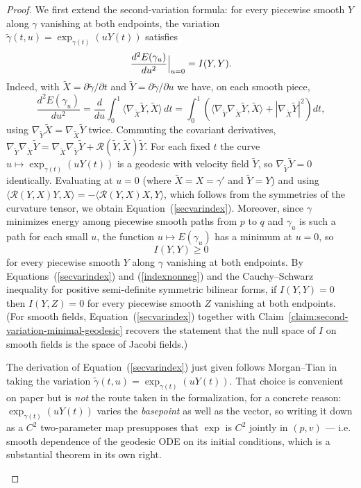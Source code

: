 \begin{proof}
We first extend the second-variation formula: for every piecewise
smooth $Y$ along $\gamma$ vanishing at both endpoints, the variation
$\tilde\gamma(t,u)=\exp_{\gamma(t)}(uY(t))$ satisfies
\begin{equation}\label{secvarindex}
\frac{d^2E(\gamma_u)}{du^2}\Bigl|_{u=0}\Bigr.=I(Y,Y).
\end{equation}
Indeed, with $\widetilde X=\partial\tilde\gamma/\partial t$ and
$\widetilde Y=\partial\tilde\gamma/\partial u$ we have, on each
smooth piece,
$$\frac{d^2E(\gamma_u)}{du^2}
=\frac{d}{du}\int_0^1\langle\nabla_{\widetilde X}\widetilde
Y,\widetilde X\rangle\,dt
=\int_0^1\left(\langle\nabla_{\widetilde Y}\nabla_{\widetilde
X}\widetilde Y,\widetilde X\rangle
+|\nabla_{\widetilde X}\widetilde Y|^2\right)dt,$$
using $\nabla_{\widetilde Y}\widetilde X=\nabla_{\widetilde
X}\widetilde Y$ twice. Commuting the covariant derivatives,
$\nabla_{\widetilde Y}\nabla_{\widetilde X}\widetilde
Y=\nabla_{\widetilde X}\nabla_{\widetilde Y}\widetilde Y+{\mathcal
R}(\widetilde Y,\widetilde X)\widetilde Y$. For each fixed $t$ the
curve $u\mapsto\exp_{\gamma(t)}(uY(t))$ is a geodesic with velocity
field $\widetilde Y$, so $\nabla_{\widetilde Y}\widetilde Y=0$
identically. Evaluating at $u=0$ (where $\widetilde X=X=\gamma'$ and
$\widetilde Y=Y$) and using
$\langle{\mathcal R}(Y,X)Y,X\rangle=-\langle{\mathcal
R}(Y,X)X,Y\rangle$, which follows from the symmetries of the
curvature tensor, we obtain
Equation~(\ref{secvarindex}). Moreover, since $\gamma$ minimizes
energy among piecewise smooth paths from $p$ to $q$ and
$\gamma_u$ is such a path for each small $u$, the function
$u\mapsto E(\gamma_u)$ has a minimum at $u=0$, so
\begin{equation}\label{indexnonneg}
I(Y,Y)\ge 0
\end{equation}
for every piecewise smooth $Y$ along $\gamma$ vanishing at both
endpoints. By Equations~(\ref{secvarindex}) and
(\ref{indexnonneg}) and the Cauchy--Schwarz inequality for
positive semi-definite symmetric bilinear forms, if $I(Y,Y)=0$ then
$I(Y,Z)=0$ for every piecewise smooth $Z$ vanishing at both
endpoints. (For smooth fields, Equation~(\ref{secvarindex})
together with
Claim~\ref{claim:second-variation-minimal-geodesic} recovers the
statement that the null space of $I$ on smooth fields is the space
of Jacobi fields.)

\begin{remark}
\label{rem:second-variation-chart-route}
The derivation of Equation~(\ref{secvarindex}) just given follows Morgan--Tian in
taking the variation $\tilde\gamma(t,u)=\exp_{\gamma(t)}(uY(t))$.  That choice is
convenient on paper but is \emph{not} the route taken in the formalization, for a
concrete reason: $\exp_{\gamma(t)}(uY(t))$ varies the \emph{basepoint} as well as
the vector, so writing it down as a $C^2$ two-parameter map presupposes that
$\exp$ is $C^2$ jointly in $(p,v)$ — i.e. smooth dependence of the geodesic ODE on
its initial conditions, which is a substantial theorem in its own right.


\end{remark}
\end{proof}
